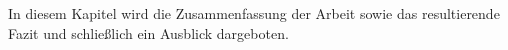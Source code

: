 

In diesem Kapitel wird die Zusammenfassung der Arbeit sowie das resultierende Fazit und schlie{\ss}lich ein Ausblick dargeboten.






